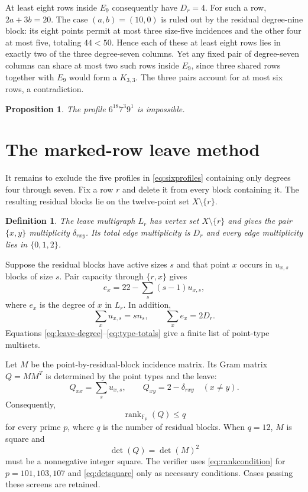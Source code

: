 \documentclass[10pt,a4paper]{amsart}
\newtheorem{proposition}[theorem]{Proposition}
\newtheorem{definition}[theorem]{Definition}
\DeclareMathOperator{\rank}{rank}
\begin{document}
At least eight rows inside $E_9$ consequently have $D_r=4$. For such a row, $2a+3b=20$. The case $(a,b)=(10,0)$ is ruled out by the residual degree-nine block: its eight points permit at most three size-five incidences and the other four at most five, totaling $44<50$. Hence each of these at least eight rows lies in exactly two of the three degree-seven columns. Yet any fixed pair of degree-seven columns can share at most two such rows inside $E_9$, since three shared rows together with $E_9$ would form a $K_{3,3}$. The three pairs account for at most six rows, a contradiction.

\begin{proposition}\label{prop:nine}
The profile $6^{18}7^3 9^1$ is impossible.
\end{proposition}

\section{The marked-row leave method}
It remains to exclude the five profiles in \eqref{eq:sixprofiles} containing only degrees four through seven. Fix a row $r$ and delete it from every block containing it. The resulting residual blocks lie on the twelve-point set $X\setminus\{r\}$.

\begin{definition}
The \emph{leave multigraph} $L_r$ has vertex set $X\setminus\{r\}$ and gives the pair $\{x,y\}$ multiplicity $\delta_{rxy}$. Its total edge multiplicity is $D_r$ and every edge multiplicity lies in $\{0,1,2\}$.
\end{definition}

Suppose the residual blocks have active sizes $s$ and that point $x$ occurs in $u_{x,s}$ blocks of size $s$. Pair capacity through $\{r,x\}$ gives
\begin{equation}\label{eq:leave-degree}
 e_x=22-\sum_s(s-1)u_{x,s},
\end{equation}
where $e_x$ is the degree of $x$ in $L_r$. In addition,
\begin{equation}\label{eq:type-totals}
 \sum_xu_{x,s}=s n_s,
 \qquad
 \sum_xe_x=2D_r.
\end{equation}
Equations \eqref{eq:leave-degree}--\eqref{eq:type-totals} give a finite list of point-type multisets.

Let $M$ be the point-by-residual-block incidence matrix. Its Gram matrix $Q=MM^T$ is determined by the point types and the leave:
\begin{equation}\label{eq:gram}
 Q_{xx}=\sum_su_{x,s},
 \qquad
 Q_{xy}=2-\delta_{rxy}\quad(x\ne y).
\end{equation}
Consequently,
\begin{equation}\label{eq:rankcondition}
  \rank_{\mathbb F_p}(Q)\le q
\end{equation}
for every prime $p$, where $q$ is the number of residual blocks. When $q=12$, $M$ is square and
\begin{equation}\label{eq:detsquare}
  \det(Q)=\det(M)^2
\end{equation}
must be a nonnegative integer square. The verifier uses \eqref{eq:rankcondition} for $p=101,103,107$ and \eqref{eq:detsquare} only as necessary conditions. Cases passing these screens are retained.
\end{document}
